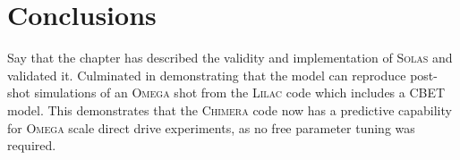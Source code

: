 \section{Conclusions}

Say that the chapter has described the validity and implementation of \textsc{Solas} and validated it.
Culminated in demonstrating that the model can reproduce post-shot simulations of an \textsc{Omega} shot from the \textsc{Lilac} code which includes a CBET model.
This demonstrates that the \textsc{Chimera} code now has a predictive capability for \textsc{Omega} scale direct drive experiments, as no free parameter tuning was required.
